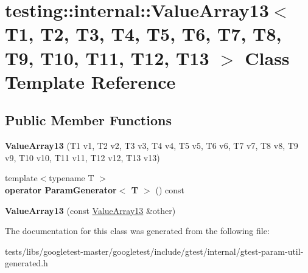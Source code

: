 \hypertarget{classtesting_1_1internal_1_1ValueArray13}{}\section{testing\+:\+:internal\+:\+:Value\+Array13$<$ T1, T2, T3, T4, T5, T6, T7, T8, T9, T10, T11, T12, T13 $>$ Class Template Reference}
\label{classtesting_1_1internal_1_1ValueArray13}
\subsection*{Public Member Functions}
\begin{DoxyCompactItemize}
\item 
\mbox{\label{classtesting_1_1internal_1_1ValueArray13_a57505ac7a4fbb86f4121bf1d41b0352d}} 
{\bfseries Value\+Array13} (T1 v1, T2 v2, T3 v3, T4 v4, T5 v5, T6 v6, T7 v7, T8 v8, T9 v9, T10 v10, T11 v11, T12 v12, T13 v13)
\item 
\mbox{\label{classtesting_1_1internal_1_1ValueArray13_a80572fc9c66a20824ae0934785b41f24}} 
{\footnotesize template$<$typename T $>$ }\\{\bfseries operator Param\+Generator$<$ T $>$} () const
\item 
\mbox{\label{classtesting_1_1internal_1_1ValueArray13_a150575c5629d3a589bf2baba0371b1da}} 
{\bfseries Value\+Array13} (const \hyperlink{classtesting_1_1internal_1_1ValueArray13}{Value\+Array13} \&other)
\end{DoxyCompactItemize}


The documentation for this class was generated from the following file\+:\begin{DoxyCompactItemize}
\item 
tests/libs/googletest-\/master/googletest/include/gtest/internal/gtest-\/param-\/util-\/generated.\+h\end{DoxyCompactItemize}
